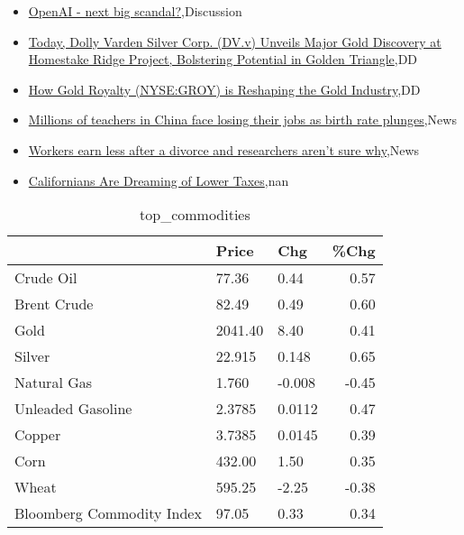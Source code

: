 \documentclass{article}%
\begin{document}
%
\begin{itemize}%
\item%
\href{https://reddit.com/r/wallstreetbets/comments/1apllem/openai\_next\_big\_scandal/}{OpenAI - next big scandal?},Discussion%
\item%
\href{https://reddit.com/r/Baystreetbets/comments/1apbjw3/today\_dolly\_varden\_silver\_corp\_dvv\_unveils\_major/}{Today, Dolly Varden Silver Corp. (DV.v) Unveils Major Gold Discovery at Homestake Ridge Project, Bolstering Potential in Golden Triangle},DD%
\item%
\href{https://reddit.com/r/Baystreetbets/comments/1ap2mud/how\_gold\_royalty\_nysegroy\_is\_reshaping\_the\_gold/}{How Gold Royalty (NYSE:GROY) is Reshaping the Gold Industry},DD%
\item%
\href{https://reddit.com/r/Economics/comments/1aposj8/millions\_of\_teachers\_in\_china\_face\_losing\_their/}{Millions of teachers in China face losing their jobs as birth rate plunges},News%
\item%
\href{https://reddit.com/r/Economics/comments/1apdm6r/workers\_earn\_less\_after\_a\_divorce\_and\_researchers/}{Workers earn less after a divorce and researchers aren't sure why},News%
\item%
\href{https://reddit.com/r/Economics/comments/1apbad5/californians\_are\_dreaming\_of\_lower\_taxes/}{Californians Are Dreaming of Lower Taxes},nan%
\end{itemize}%


\begin{table}[htbp]%
\caption{top\_commodities}%
\centering%
\begin{adjustbox}{width=1\textwidth}%
\begin{tabular}{lllr}
\toprule
                          &   Price &    Chg &  \%Chg \\
\midrule
               Crude Oil  &   77.36 &   0.44 &  0.57 \\
             Brent Crude  &   82.49 &   0.49 &  0.60 \\
                    Gold  & 2041.40 &   8.40 &  0.41 \\
                  Silver  &  22.915 &  0.148 &  0.65 \\
             Natural Gas  &   1.760 & -0.008 & -0.45 \\
       Unleaded Gasoline  &  2.3785 & 0.0112 &  0.47 \\
                  Copper  &  3.7385 & 0.0145 &  0.39 \\
                    Corn  &  432.00 &   1.50 &  0.35 \\
                   Wheat  &  595.25 &  -2.25 & -0.38 \\
Bloomberg Commodity Index &   97.05 &   0.33 &  0.34 \\
\bottomrule
\end{tabular}
%
\end{adjustbox}%
\end{table}
\end{document}
